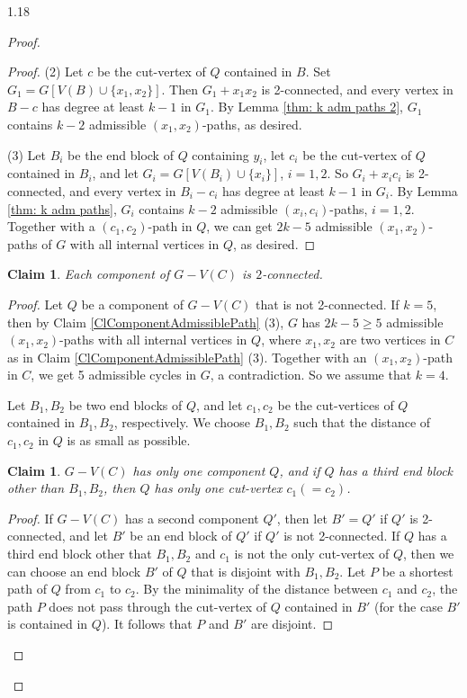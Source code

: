 \documentclass[10pt]{article}
\newtheorem{claim}{Claim}
\newtheorem{subclaim}{Claim}[claim]
\begin{document}
\begin{spacing}{1.18}
\begin{proof}
\begin{proof}
    (2) Let $c$ be the cut-vertex of $Q$ contained in $B$. Set $G_1=G[V(B)\cup\{x_1,x_2\}]$. Then $G_1+x_1x_2$ is 2-connected, and every vertex in $B-c$ has degree at least $k-1$ in $G_1$. By Lemma \ref{thm: k adm paths 2}, $G_1$ contains $k-2$ admissible $(x_1,x_2)$-paths, as desired.

    (3) Let $B_i$ be the end block of $Q$ containing $y_i$, let $c_i$ be the cut-vertex of $Q$ contained in $B_i$, and let $G_i=G[V(B_i)\cup\{x_i\}]$, $i=1,2$. So $G_i+x_ic_i$ is 2-connected, and every vertex in $B_i-c_i$ has degree at least $k-1$ in $G_i$. By Lemma \ref{thm: k adm paths}, $G_i$ contains $k-2$ admissible $(x_i,c_i)$-paths, $i=1,2$. Together with a $(c_1,c_2)$-path in $Q$, we can get $2k-5$ admissible $(x_1,x_2)$-paths of $G$ with all internal vertices in $Q$, as desired.
\end{proof}

\begin{claim}\label{claim: 2-connected components}
    Each component of $G-V(C)$ is $2$-connected. 
\end{claim}

\begin{proof}
    Let $Q$ be a component of $G-V(C)$ that is not 2-connected. If $k=5$, then by Claim \ref{ClComponentAdmissiblePath} (3), $G$ has $2k-5\geqslant 5$ admissible $(x_1,x_2)$-paths with all internal vertices in $Q$, where $x_1,x_2$ are two vertices in $C$ as in Claim \ref{ClComponentAdmissiblePath} (3). Together with an $(x_1,x_2)$-path in $C$, we get 5 admissible cycles in $G$, a contradiction. So we assume that $k=4$. 
    
    Let $B_1,B_2$ be two end blocks of $Q$, and let $c_1,c_2$ be the cut-vertices of $Q$ contained in $B_1,B_2$, respectively. We choose $B_1,B_2$ such that the distance of $c_1,c_2$ in $Q$ is as small as possible. 

    \begin{subclaim}\label{ClOneComponent}
        $G-V(C)$ has only one component $Q$, and if $Q$ has a third end block other than $B_1,B_2$, then $Q$ has only one cut-vertex $c_1(=c_2)$.
    \end{subclaim}

    \begin{proof}
        If $G-V(C)$ has a second component $Q'$, then let $B'=Q'$ if $Q'$ is 2-connected, and let $B'$ be an end block of $Q'$ if $Q'$ is not 2-connected. If $Q$ has a third end block other that $B_1,B_2$ and $c_1$ is not the only cut-vertex of $Q$, then we can choose an end block $B'$ of $Q$ that is disjoint with $B_1,B_2$. Let $P$ be a shortest path of $Q$ from $c_1$ to $c_2$. By the minimality of the distance between $c_1$ and $c_2$, the path $P$ does not pass through the cut-vertex of $Q$ contained in $B'$ (for the case $B'$ is contained in $Q$). It follows that $P$ and $B'$ are disjoint.


\end{proof}
\end{proof}
\end{proof}
\end{spacing}
\end{document}
